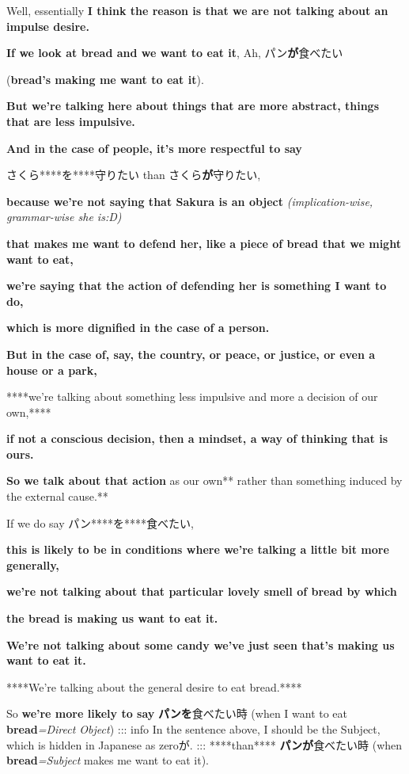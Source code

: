Well, essentially {\bf I think the reason is that we are not talking about an impulse desire.}

{\bf If we look at bread and we want to eat it}, Ah, パン{\bf が}食べたい

({\bf bread's making me want to eat it}).

\thinrule

{\bf But we're talking here about things that are more abstract, things that are less impulsive.}

{\bf And in the case of people, it's more respectful to say}

さくら****を****守りたい than さくら{\bf が}守りたい,

{\bf because we're not saying that Sakura is an object} {\em (implication-wise, grammar-wise she is:D)}

{\bf that makes me want to defend her, like a piece of bread that we might want to eat,}

{\bf we're saying that the action of defending her is something I want to do,}

{\bf which is more dignified in the case of a person.}

\thinrule

{\bf But in the case of, say, the country, or peace, or justice, or even a house or a park,}

****we're talking about something less impulsive and more a decision of our own,****

{\bf if not a conscious decision, then a mindset, a way of thinking that is ours.}

{\bf So we talk about that action }as our own** rather than something induced by the external cause.**

\thinrule

If we do say パン****を****食べたい,

{\bf this is likely to be in conditions where we're talking a little bit more generally,}

{\bf we're not talking about that particular lovely smell of bread by which}

{\bf the bread is making us want to eat it.}

{\bf We're not talking about some candy we've just seen that's making us want to eat it.}

****We're talking about the general desire to eat bread.****

\thinrule

So {\bf we're more likely to say} {\bf パンを}食べたい時 (when I want to eat {\bf bread}{\em =Direct Object}) ::: info In the sentence above, I should be the Subject, which is hidden in Japanese as zeroが. ::: ****than**** {\bf パンが}食べたい時 (when {\bf bread}{\em =Subject} makes me want to eat it).

